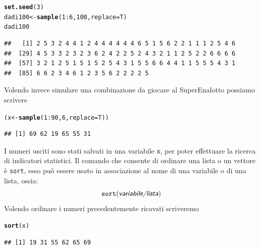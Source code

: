 \documentclass[onecolumn,12pt]{book}\usepackage[]{graphicx}\usepackage[]{color}
\makeatletter
\newcommand{\hlnum}[1]{\textcolor[rgb]{0.686,0.059,0.569}{#1}}%
\newcommand{\hlopt}[1]{\textcolor[rgb]{0,0,0}{#1}}%
\newcommand{\hlstd}[1]{\textcolor[rgb]{0.345,0.345,0.345}{#1}}%
\newcommand{\hlkwb}[1]{\textcolor[rgb]{0.69,0.353,0.396}{#1}}%
\newcommand{\hlkwc}[1]{\textcolor[rgb]{0.333,0.667,0.333}{#1}}%
\newcommand{\hlkwd}[1]{\textcolor[rgb]{0.737,0.353,0.396}{\textbf{#1}}}%
\newenvironment{kframe}{%
 \def\at@end@of@kframe{}%
 \ifinner\ifhmode%
  \def\at@end@of@kframe{\end{minipage}}%
  \begin{minipage}{\columnwidth}%
 \fi\fi%
 \def\FrameCommand##1{\hskip\@totalleftmargin \hskip-\fboxsep
 \colorbox{shadecolor}{##1}\hskip-\fboxsep
     \hskip-\linewidth \hskip-\@totalleftmargin \hskip\columnwidth}%
 \MakeFramed {\advance\hsize-\width
   \@totalleftmargin\z@ \linewidth\hsize
   \@setminipage}}%
 {\par\unskip\endMakeFramed%
 \at@end@of@kframe}
\newenvironment{knitrout}{}{} %
\newcommand{\varia}[1]{\textsl{\textsf{#1}}}
\makeatother
\begin{document}
\begin{knitrout}
\color{fgcolor}\begin{kframe}
\begin{alltt}
\hlkwd{set.seed}\hlstd{(}\hlnum{3}\hlstd{)}
\hlstd{dadi100}\hlkwb{<-}\hlkwd{sample}\hlstd{(}\hlnum{1}\hlopt{:}\hlnum{6}\hlstd{,}\hlnum{100}\hlstd{,}\hlkwc{replace}\hlstd{=T)}
\hlstd{dadi100}
\end{alltt}
\begin{verbatim}
##   [1] 2 5 3 2 4 4 1 2 4 4 4 4 4 4 6 5 1 5 6 2 2 1 1 1 2 5 4 6
##  [29] 4 5 3 3 2 3 2 3 6 2 4 2 2 5 2 4 3 2 1 1 2 5 2 2 6 6 6 6
##  [57] 3 2 1 2 5 1 5 1 5 2 5 4 3 1 5 5 6 6 4 4 1 1 5 5 5 4 3 1
##  [85] 6 6 2 3 4 6 1 2 3 5 6 2 2 2 2 5
\end{verbatim}
\end{kframe}
\end{knitrout}
Volendo invece simulare una combinazione da giocare al SuperEnalotto possiamo scrivere

\begin{knitrout}
\color{fgcolor}\begin{kframe}
\begin{alltt}
\hlstd{(x}\hlkwb{<-}\hlkwd{sample}\hlstd{(}\hlnum{1}\hlopt{:}\hlnum{90}\hlstd{,}\hlnum{6}\hlstd{,}\hlkwc{replace}\hlstd{=T))}
\end{alltt}
\begin{verbatim}
## [1] 69 62 19 65 55 31
\end{verbatim}
\end{kframe}
\end{knitrout}
I numeri usciti sono stati salvati  in una variabile \texttt{x}, per poter effettuare la ricerca di indicatori statistici.
Il comando che consente di ordinare una lista o un vettore \`e \texttt{sort}, esso pu\`o essere usato in associazione al nome di una variabile o di una lista, ossia:
\begin{equation}\texttt{sort}(\varia{variabile/lista})\end{equation}
Volendo ordinare i numeri precedentemente ricavati scriveremo
\begin{knitrout}
\color{fgcolor}\begin{kframe}
\begin{alltt}
\hlkwd{sort}\hlstd{(x)}
\end{alltt}
\begin{verbatim}
## [1] 19 31 55 62 65 69
\end{verbatim}
\end{kframe}
\end{knitrout}
\end{document}
